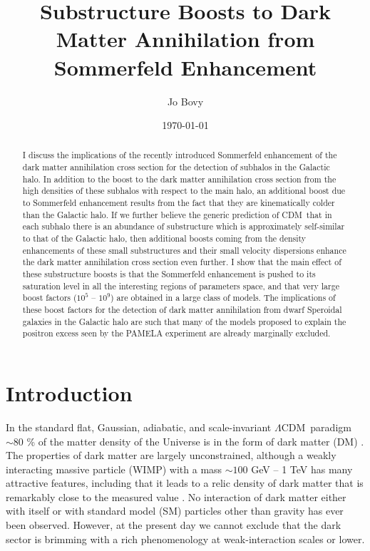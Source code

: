 \documentclass[aps,prd,twocolumn,amsmath,amssymb,floatfix,nofootinbib,10pt]{revtex4}
\newcommand{\CDM}{CDM}
\newcommand{\LCDM}{\ensuremath{\Lambda}\CDM}
\newcommand{\DM}{DM}
\newcommand{\SM}{SM}
\begin{document}
\title{Substructure Boosts to Dark Matter Annihilation from Sommerfeld Enhancement}
\author{Jo Bovy} 

\date{\today}

\begin{abstract}
I discuss the implications of the recently introduced Sommerfeld
enhancement of the dark matter annihilation cross section for the
detection of subhalos in the Galactic halo.  In addition to the boost
to the dark matter annihilation cross section from the high densities
of these subhalos with respect to the main halo, an additional boost
due to Sommerfeld enhancement results from the fact that they are
kinematically colder than the Galactic halo. If we further believe the
generic prediction of \CDM\ that in each subhalo there is an abundance
of substructure which is approximately self-similar to that of the
Galactic halo, then additional boosts coming from the density
enhancements of these small substructures and their small velocity
dispersions enhance the dark matter annihilation cross section even
further. I show that the main effect of these substructure boosts is
that the Sommerfeld enhancement is pushed to its saturation level in
all the interesting regions of parameters space, and that very large
boost factors ($10^5$ -- $10^9$) are obtained in a large class of
models. The implications of these boost factors for the detection of
dark matter annihilation from dwarf Speroidal galaxies in the Galactic
halo are such that many of the models proposed to explain the positron
excess seen by the PAMELA experiment are already marginally excluded.
\end{abstract}

\maketitle

\section{Introduction}
In the standard flat, Gaussian, adiabatic, and scale-invariant \LCDM\
paradigm $\sim\!80$ \% of the matter density of the Universe is in the
form of dark matter (\DM) \cite{2008arXiv0803.0547K}. The properties
of dark matter are largely unconstrained, although a weakly
interacting massive particle (WIMP) with a mass $\sim\!100$ GeV -- 1
TeV has many attractive features, including that it leads to a relic
density of dark matter that is remarkably close to the measured value
\cite{1996PhR...267..195J}. No interaction of dark matter either with
itself or with standard model (\SM) particles other than gravity has
ever been observed. However, at the present day we cannot exclude that
the dark sector is brimming with a rich phenomenology at
weak-interaction scales or lower.
\end{document}
